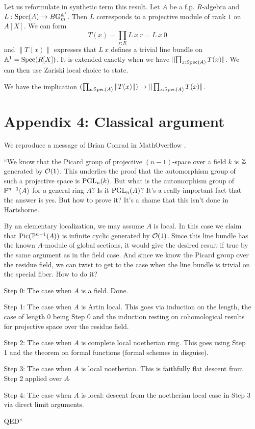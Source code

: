 Let us reformulate in synthetic term this result. Let $A$ be a f.p. $R$-algebra and $L:\operatorname{Spec}(A)\rightarrow B\mathbb{G}_m^{\mathbb{A}^1}$.
Then $L$ corresponds to a projective module of rank $1$ on $A[X]$. We can form
$$T(x) = \prod_{r:R}L~x~r = L~x~0$$
and $\|T(x)\|$ expresses that $L~x$ defines a trivial line bundle on $\mathbb{A}^1 = \operatorname{Spec}(R[X])$.
It is extended exactly when we have
$\|{\prod_{x:\operatorname{Spec}(A)}T(x)}\|$. We can then use Zariski local choice to state.

\begin{proposition}\label{c2}
  We have the implication $(\prod_{x:\operatorname{Spec}(A)}\|T(x)\|)\rightarrow \|\prod_{x:\operatorname{Spec}(A)}T(x)\|$.
\end{proposition}

\newpage

\section*{Appendix 4: Classical argument}

We reproduce a message of Brian Conrad in MathOverflow \cite{conrad-mathoverflow-16324}.

\medskip

``We know that the Picard group of projective $(n-1)$-space over a field $k$ is $\mathbb{Z}$
generated by $\mathcal{O}(1)$.
This underlies the proof that the automorphism group of such a projective space is $\operatorname{PGL}_n(k)$.
But what is the automorphism group of $\mathbb{P}^{n-1}(A)$ for a general ring $A$? Is it $\operatorname{PGL}_n(A)$?
It's a really important fact that the answer is yes.
But how to prove it? It's a shame that this isn't done in Hartshorne.

By an elementary localization, we may assume $A$ is local.
In this case we claim that $\mathrm{Pic}(\mathbb{P}^{n-1}(A))$ is infinite cyclic generated by $\mathcal{O}(1)$.
Since this line bundle has the known $A$-module of global sections,
it would give the desired result if true by the same argument as in the field case.
And since we know the Picard group over the residue field, we can twist
to get to the case when the line bundle is trivial on the special fiber. How to do it?

\medskip

 Step 0: The case when $A$ is a field. Done.

 \medskip

 Step 1: The case when $A$ is Artin local.
 This goes via induction on the length, the case of length $0$ being Step $0$
 and the induction resting on cohomological results for projective space over the residue field.

  \medskip

 Step 2: The case when $A$ is complete local noetherian ring. This goes
 using Step 1 and the theorem on formal functions (formal schemes in disguise).

  \medskip

 Step 3: The case when $A$ is local noetherian.
 This is faithfully flat descent from Step 2 applied over $A~\widehat{}$

 \medskip
 
 Step 4: The case when $A$ is local:
 descent from the noetherian local case in Step 3 via direct limit arguments.

\medskip
 
QED''
